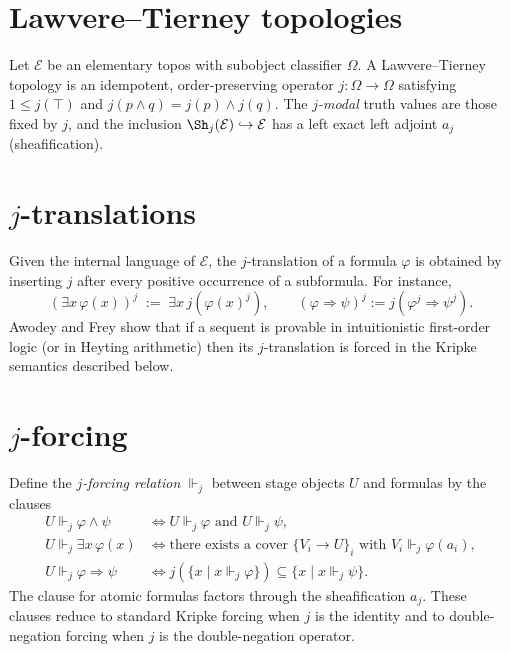 \documentclass[12pt]{article}
\newcommand{\E}{\mathcal{E}}
\newcommand{\OmegaE}{\Omega}
\begin{document}
\section*{Lawvere--Tierney topologies}
Let $\E$ be an elementary topos with subobject classifier $\OmegaE$.  A Lawvere--Tierney topology is an idempotent, order-preserving operator $j\colon\OmegaE\to\OmegaE$ satisfying $1\leq j(\top)$ and $j(p\land q)=j(p)\land j(q)$.
The \emph{$j$-modal} truth values are those fixed by $j$, and the inclusion $\Sh_j(\E)\hookrightarrow \E$ has a left exact left adjoint $a_j$ (sheafification).

\section*{$j$-translations}
Given the internal language of $\E$, the $j$-translation of a formula $\varphi$ is obtained by inserting $j$ after every positive occurrence of a subformula.  For instance,
\[
(\exists x\, \varphi(x))^j \;:=\; \exists x\, j(\varphi(x)^j),
\qquad (\varphi\Rightarrow\psi)^j := j(\varphi^j \Rightarrow \psi^j).
\]
Awodey and Frey show that if a sequent is provable in intuitionistic first-order logic (or in Heyting arithmetic) then its $j$-translation is forced in the Kripke semantics described below.

\section*{$j$-forcing}
Define the \emph{$j$-forcing relation} $\Vdash_j$ between stage objects $U$ and formulas by the clauses
\begin{align*}
U \Vdash_j \varphi \land \psi &\iff U \Vdash_j \varphi \text{ and } U \Vdash_j \psi, \\
U \Vdash_j \exists x\, \varphi(x) &\iff \text{there exists a cover } \{V_i\to U\}_i \text{ with } V_i \Vdash_j \varphi(a_i), \\
U \Vdash_j \varphi\Rightarrow\psi &\iff j(\{ x\mid x\Vdash_j \varphi\}) \subseteq \{x\mid x\Vdash_j \psi\}.
\end{align*}
The clause for atomic formulas factors through the sheafification $a_j$.  These clauses reduce to standard Kripke forcing when $j$ is the identity and to double-negation forcing when $j$ is the double-negation operator.
\end{document}
